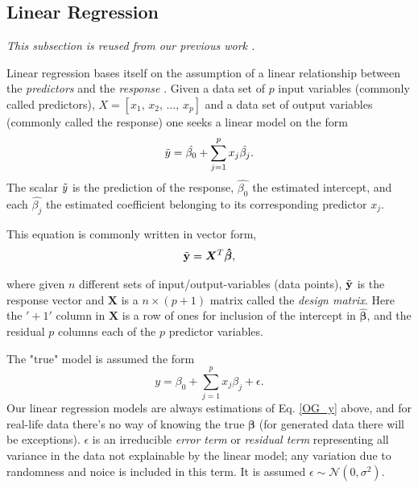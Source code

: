 
\subsection{Linear Regression}\label{Linreg}
\textit{This subsection is reused from our previous work \citep[p. 2]{project1}.}


Linear regression bases itself on the assumption of a linear relationship between the \textit{predictors} and the \textit{response} \cite[p.21-26]{fahrmeir}. 
Given a data set of $p$ input variables (commonly called predictors), $X=[x_1, \, x_2, \, \ldots, \, x_p]$ and a data set of output variables (commonly called the response) one seeks a linear model on the form
\begin{equation}
\Tilde{y}=\hat{\beta_0}+\sum_{j=1}^{p}x_j\hat{\beta_j}.
\end{equation}
The scalar $\Tilde{y}$ is the prediction of the response, $\hat{\beta_0}$ the estimated intercept, and each $\hat{\beta_j}$ the estimated coefficient belonging to its corresponding predictor $x_j$. 

This equation is commonly written in vector form, 
\begin{equation}
\Tilde{\mathbf{y}}=\boldsymbol{X}^T\boldsymbol{\hat{\beta}},
\end{equation}

where given $n$ different sets of input/output-variables (data points), $\Tilde{\mathbf{y}}$ is the response vector and $\boldsymbol{X}$ is a $n\times (p+1)$ matrix called the \textit{design matrix}\label{design-matrix}. Here the $'+1'$ column in $\boldsymbol{X}$ is a row of ones for inclusion of the intercept in $\boldsymbol{\hat{\beta}}$, and the residual $p$ columns each of the $p$ predictor variables. 


The "true" model is assumed the form 
\begin{equation}\label{OG_y}
y=\beta_0+\sum_{j=1}^{p}x_j\beta_j+\epsilon.
\end{equation}
Our linear regression models are always estimations of Eq. \ref{OG_y} above, and for real-life data there's no way of knowing the true $\boldsymbol{\beta}$ (for generated data there will be exceptions). 
$\epsilon$ is an irreducible \textit{error term} or \textit{residual term} representing all variance in the data not explainable by the linear model; any variation due to randomness and noice is included in this term. It is assumed $\epsilon \sim  
\mathcal{N}(0,\sigma^2)$.

